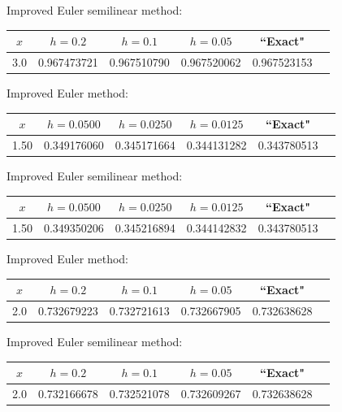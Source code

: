 \hspace{.75in}
{\small Improved Euler semilinear method:
\begin{tabular}{|c|r|r|r|r|r|}
\hline
\multicolumn{1}{|c|}{$x$}&
\multicolumn{1}{|c|}{$h=0.2$}&
\multicolumn{1}{|c|}{$h=0.1$}&
\multicolumn{1}{|c|}{$h=0.05$}&
\multicolumn{1}{|c|}{``Exact"}\\ \hline
3.0 & 0.967473721 & 0.967510790 & 0.967520062 & 0.967523153 \\
\hline
\end{tabular}}

\bigskip

{\small Improved Euler method:
\begin{tabular}{|c|r|r|r|r|r|}
\hline
\multicolumn{1}{|c|}{$x$}&
\multicolumn{1}{|c|}{$h=0.0500$}&
\multicolumn{1}{|c|}{$h=0.0250$}&
\multicolumn{1}{|c|}{$h=0.0125$}&
\multicolumn{1}{|c|}{``Exact"}\\ \hline
1.50 &0.349176060  & 0.345171664 & 0.344131282 & 0.343780513 \\
\hline
\end{tabular}}

\bigskip

\hspace{.75in}
{\small Improved Euler semilinear method:
\begin{tabular}{|c|r|r|r|r|r|}
\hline
\multicolumn{1}{|c|}{$x$}&
\multicolumn{1}{|c|}{$h=0.0500$}&
\multicolumn{1}{|c|}{$h=0.0250$}&
\multicolumn{1}{|c|}{$h=0.0125$}&
\multicolumn{1}{|c|}{``Exact"}\\ \hline
1.50 & 0.349350206 & 0.345216894 & 0.344142832 & 0.343780513 \\
\hline
\end{tabular}}

\bigskip


{\small Improved Euler method:
\begin{tabular}{|c|r|r|r|r|r|}
\hline
\multicolumn{1}{|c|}{$x$}&
\multicolumn{1}{|c|}{$h=0.2$}&
\multicolumn{1}{|c|}{$h=0.1$}&
\multicolumn{1}{|c|}{$h=0.05$}&
\multicolumn{1}{|c|}{``Exact"}\\ \hline
2.0 & 0.732679223 & 0.732721613 & 0.732667905 & 0.732638628 \\
\hline
\end{tabular}}

\bigskip

\hspace{.75in}
{\small Improved Euler semilinear method:
\begin{tabular}{|c|r|r|r|r|r|}
\hline
\multicolumn{1}{|c|}{$x$}&
\multicolumn{1}{|c|}{$h=0.2$}&
\multicolumn{1}{|c|}{$h=0.1$}&
\multicolumn{1}{|c|}{$h=0.05$}&
\multicolumn{1}{|c|}{``Exact"}\\ \hline
2.0 & 0.732166678 & 0.732521078 & 0.732609267 & 0.732638628 \\
\hline
\end{tabular}}

